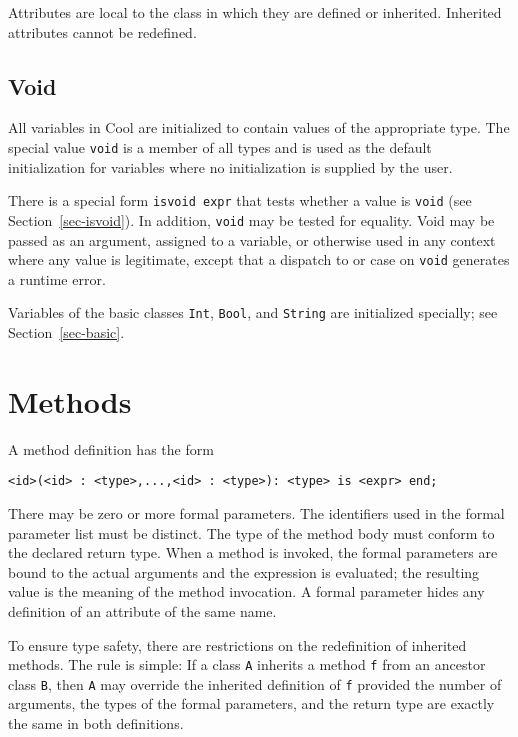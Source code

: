  Attributes are local to the class in which they are defined or inherited.
Inherited attributes cannot be redefined.

\subsection{Void}

All variables in Cool are initialized to contain values of the
appropriate type.  The special value {\tt void} is a member of all
types and is used as the default initialization for variables where
no initialization is supplied by the user.

There is a special form {\tt isvoid expr} that tests whether a value
is {\tt void} (see Section~\ref{sec-isvoid}).  In addition, {\tt void}
may be tested for equality.  Void may be passed as an
argument, assigned to a variable, or otherwise used in any context
where any value is legitimate, except that a dispatch to or case on
{\tt void} generates a runtime error.

Variables of the basic classes {\tt Int}, {\tt Bool}, and {\tt String} are 
initialized specially; see Section~\ref{sec-basic}.

\section{Methods}
\label{sec-method}

A method definition has the form
\begin{verbatim}
<id>(<id> : <type>,...,<id> : <type>): <type> is <expr> end;
\end{verbatim}
There may be zero or more formal parameters.  The identifiers used
in the formal parameter list must be distinct.  The type of the
method body must conform to the declared return type.  When a method is
invoked, the formal parameters are bound to the actual arguments
and the expression is evaluated; the resulting value is the meaning
of the method invocation.  A formal parameter
hides any definition of an attribute of the same name.  

To ensure type safety, there are restrictions on the redefinition of
inherited methods.  The rule is simple: If a class {\tt A} inherits a
method {\tt f} from an ancestor class {\tt B}, then {\tt A} may
override the inherited definition of {\tt f} provided the number of
arguments, the types of the formal parameters, and the return type are
exactly the same in both definitions. 

